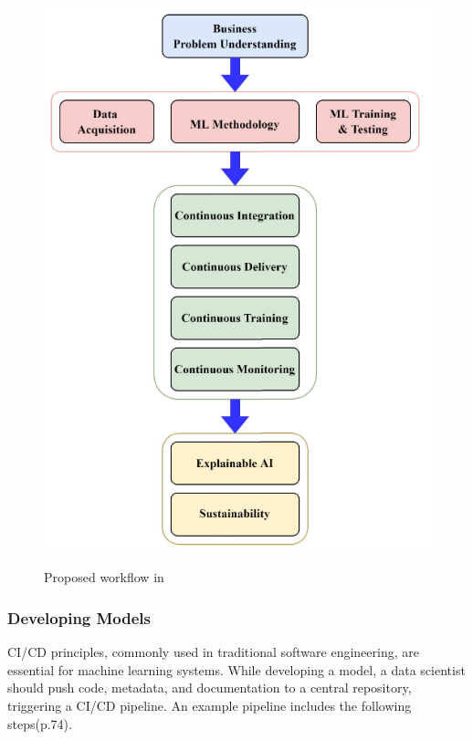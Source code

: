 \begin{figure}[!htbp]
    \caption{Proposed workflow in\cite{9792270}}
    \centering
    \includegraphics[scale=0.3]{images/taxo-workflow}
    \label{fig:taxo-workflow}
\end{figure}

\subsubsection{Developing Models}
CI/CD principles, commonly used in traditional software engineering, are essential for machine learning systems.
While developing a model, a data scientist should push code, metadata, and documentation to a central repository, triggering a CI/CD pipeline.
An example pipeline includes the following steps\cite{treveil2020introducing}(p.74).

